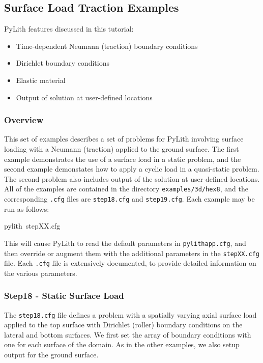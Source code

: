 
\subsection{\label{sec:example:3dhex8-surfload}Surface Load Traction Examples}

PyLith features discussed in this tutorial:
\begin{itemize}
\item Time-dependent Neumann (traction) boundary conditions
\item Dirichlet boundary conditions
\item Elastic material
\item Output of solution at user-defined locations
\end{itemize}

\subsubsection{Overview}

This set of examples describes a set of problems for PyLith involving
surface loading with a Neumann (traction) applied to the ground surface.
The first example demonstrates the use of a surface load in a static
problem, and the second example demonstates how to apply a cyclic
load in a quasi-static problem. The second problem also includes output
of the solution at user-defined locations. All of the examples are
contained in the directory \texttt{examples/3d/hex8}, and the corresponding
\texttt{.cfg} files are \texttt{step18.cfg} and \texttt{step19.cfg}.
Each example may be run as follows:
\begin{lyxcode}
pylith~stepXX.cfg
\end{lyxcode}
This will cause PyLith to read the default parameters in \texttt{pylithapp.cfg},
and then override or augment them with the additional parameters in
the \texttt{stepXX.cfg} file. Each \texttt{.cfg} file is extensively
documented, to provide detailed information on the various parameters.


\subsubsection{Step18 - Static Surface Load}

The \texttt{step18.cfg} file defines a problem with a spatially varying
axial surface load applied to the top surface with Dirichlet (roller)
boundary conditions on the lateral and bottom surfaces. We first set
the array of boundary conditions with one for each surface of the
domain. As in the other examples, we also setup output for the ground
surface.

